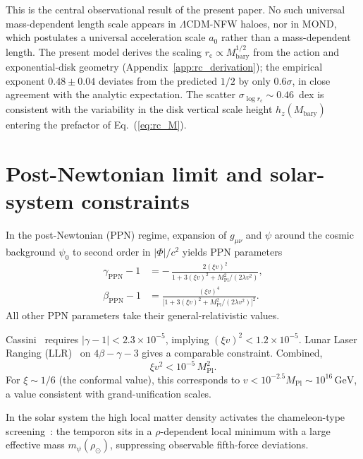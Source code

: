\documentclass[%
    aps,
    prd,
    reprint,
    superscriptaddress,
    nofootinbib,
    floatfix,
    amsmath,amssymb,
]{revtex4-2}
\newcommand{\Mbary}{M_{\mathrm{bary}}}
\newcommand{\rc}{r_{\mathrm{c}}}
\newcommand{\MPl}{M_{\mathrm{Pl}}}
\begin{document}
This is the central observational result of the present paper.
No such universal mass-dependent length scale appears in
$\Lambda$CDM-NFW haloes, nor in MOND, which postulates a
universal acceleration scale $a_{0}$ rather than a
mass-dependent length. The present model derives the scaling
$\rc\propto\Mbary^{1/2}$ from the action and exponential-disk
geometry (Appendix~\ref{app:rc_derivation}); the empirical
exponent $0.48\pm 0.04$ deviates from the predicted $1/2$ by
only $0.6\sigma$, in close agreement with the analytic
expectation. The scatter $\sigma_{\log\rc}\!\sim\!0.46$~dex is
consistent with the variability in the disk vertical scale
height $h_{z}(\Mbary)$~\cite{Bizyaev2014} entering the
prefactor of Eq.~(\ref{eq:rc_M}).

\section{Post-Newtonian limit and solar-system constraints}
\label{sec:ppn}

In the post-Newtonian (PPN) regime, expansion of $g_{\mu\nu}$ and
$\psi$ around the cosmic background $\psi_{0}$ to second order in
$|\Phi|/c^{2}$ yields PPN parameters
\begin{align}
\gamma_{\mathrm{PPN}} - 1
   &= -\,\frac{2(\xi v)^{2}}{1 + 3(\xi v)^{2} + \MPl^{2}/(2\lambda v^{2})}, \\
\beta_{\mathrm{PPN}} - 1
   &= \frac{(\xi v)^{4}}{\bigl[1 + 3(\xi v)^{2} + \MPl^{2}/(2\lambda v^{2})\bigr]^{2}}.
\end{align}
All other PPN parameters take their general-relativistic values.

Cassini~\cite{Bertotti2003} requires $|\gamma-1|<2.3\times 10^{-5}$,
implying $(\xi v)^{2} < 1.2\times 10^{-5}$. Lunar Laser Ranging
(LLR)~\cite{Williams2004} on $4\beta - \gamma - 3$ gives
a comparable constraint. Combined,
\begin{equation}
\label{eq:xiv2_bound}
\xi v^{2} < 10^{-5}\,\MPl^{2}.
\end{equation}
For $\xi \sim 1/6$ (the conformal value), this corresponds to
$v < 10^{-2.5}\MPl \sim 10^{16}\,\mathrm{GeV}$, a value consistent
with grand-unification scales.

In the solar system the high local matter density activates
the chameleon-type screening~\cite{Khoury2004}: the temporon
sits in a $\rho$-dependent local minimum with a large effective
mass $m_{\psi}(\rho_{\odot})$, suppressing observable fifth-force
deviations.
\end{document}
